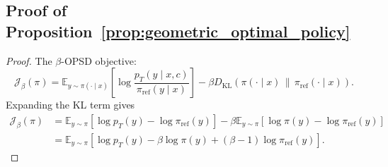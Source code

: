 \subsection{Proof of Proposition~\ref{prop:geometric_optimal_policy}}
\label{app:geometric-optimal-policy}
\begin{proof}
The $\beta$-OPSD objective:
\begin{equation}
    \mathcal{J}_{\beta}(\pi)
    =
    \mathbb{E}_{y\sim\pi(\cdot\mid x)}
    \left[
    \log
    \frac{
    p_T(y\mid x,c)
    }{
    \pi_{\mathrm{ref}}(y\mid x)
    }
    \right]
    -
    \beta
    D_{\mathrm{KL}}
    \left(
    \pi(\cdot\mid x)
    \,\middle\|\,
    \pi_{\mathrm{ref}}(\cdot\mid x)
    \right).
\end{equation}
Expanding the KL term gives
\begin{align}
    \mathcal{J}_{\beta}(\pi)
    &=
    \mathbb{E}_{y\sim\pi}
    \left[
    \log p_T(y)
    -
    \log \pi_{\mathrm{ref}}(y)
    \right]
    -
    \beta
    \mathbb{E}_{y\sim\pi}
    \left[
    \log \pi(y)
    -
    \log \pi_{\mathrm{ref}}(y)
    \right] \\
    &=
    \mathbb{E}_{y\sim\pi}
    \left[
    \log p_T(y)
    -
    \beta \log \pi(y)
    +
    (\beta-1)\log \pi_{\mathrm{ref}}(y)
    \right].
    \label{eq:beta_opsd_expanded_for_optimal_policy}
\end{align}


\end{proof}
